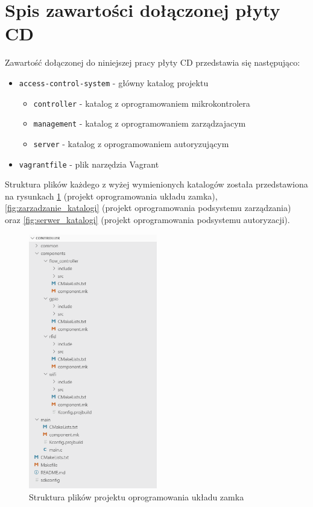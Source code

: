 \label{app:app1}

    \section{Spis zawartości dołączonej płyty CD}

        Zawartość dołączonej do niniejszej pracy płyty CD przedstawia się następująco:

        \begin{itemize}
            \item \texttt{access-control-system} - główny katalog projektu
                \begin{itemize}
                    \item \texttt{controller} - katalog z oprogramowaniem mikrokontrolera
                    \item \texttt{management} - katalog z oprogramowaniem zarządzajacym
                    \item \texttt{server} - katalog z oprogramowaniem autoryzującym
                \end{itemize}
                \item \texttt{vagrantfile} - plik narzędzia Vagrant
        \end{itemize}

        Struktura plików każdego z wyżej wymienionych katalogów została przedstawiona na rysunkach \ref{fig:controller_katalogi} (projekt oprogramowania układu zamka), \ref{fig:zarzadzanie_katalogi} (projekt oprogramowania podsystemu zarządzania) oraz \ref{fig:serwer_katalogi} (projekt oprogramowania podsystemu autoryzacji).

    \begin{figure}[]
        \centering
        \includegraphics[width=0.5\textwidth]{chapters/images/struktura_katalogow.png}
        \caption{Struktura plików projektu oprogramowania układu zamka}
        \label{fig:controller_katalogi}
    \end{figure}

